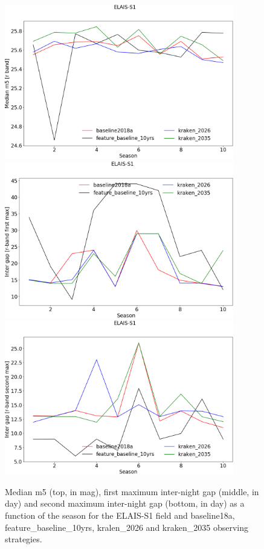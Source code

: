 \begin{figure}[htbp]
\begin{center}
  
  \includegraphics[width=10cm]{Figures/ELAIS-S1_med_m5.png}
  \includegraphics[width=10cm]{Figures/ELAIS-S1_intergap_max1.png}
    \includegraphics[width=10cm]{Figures/ELAIS-S1_intergap_max2.png}
 \caption{Median m5 (top, in mag), first maximum inter-night gap (middle, in day) and second maximum inter-night gap (bottom, in day)  as a function of the season for the ELAIS-S1 field and baseline18a, feature\_baseline\_10yrs, kralen\_2026 and kraken\_2035 observing strategies.}\label{fig:elais-s1_m5}
\end{center}
\end{figure}


